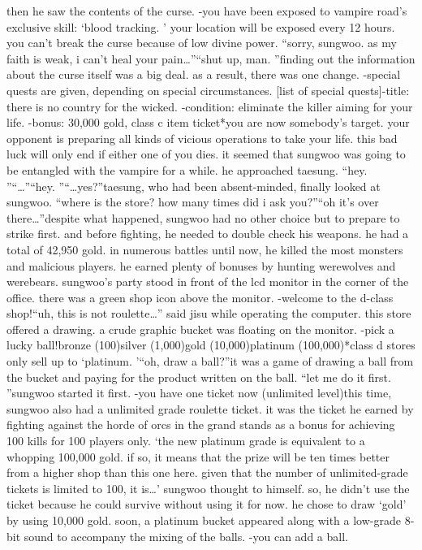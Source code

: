 then he saw the contents of the curse.
-you have been exposed to vampire road’s exclusive skill: ‘blood tracking.
’ your location will be exposed every 12 hours.
you can’t break the curse because of low divine power.
“sorry, sungwoo.
 as my faith is weak, i can’t heal your pain…”“shut up, man.
”finding out the information about the curse itself was a big deal.
as a result, there was one change.
-special quests are given, depending on special circumstances.
[list of special quests]-title: there is no country for the wicked.
-condition: eliminate the killer aiming for your life.
-bonus: 30,000 gold, class c item ticket*you are now somebody’s target.
 your opponent is preparing all kinds of vicious operations to take your life.
 this bad luck will only end if either one of you dies.
it seemed that sungwoo was going to be entangled with the vampire for a while.
he approached taesung.
“hey.
”“…”“hey.
”“…yes?”taesung, who had been absent-minded, finally looked at sungwoo.
“where is the store? how many times did i ask you?”“oh it’s over there…”despite what happened, sungwoo had no other choice but to prepare to strike first.
and before fighting, he needed to double check his weapons.
he had a total of 42,950 gold.
 in numerous battles until now, he killed the most monsters and malicious players.
 he earned plenty of bonuses by hunting werewolves and werebears.
sungwoo’s party stood in front of the lcd monitor in the corner of the office.
 there was a green shop icon above the monitor.
-welcome to the d-class shop!“uh, this is not roulette…” said jisu while operating the computer.
 this store offered a drawing.
 a crude graphic bucket was floating on the monitor.
-pick a lucky ball!bronze (100)silver (1,000)gold (10,000)platinum (100,000)*class d stores only sell up to ‘platinum.
’“oh, draw a ball?”it was a game of drawing a ball from the bucket and paying for the product written on the ball.
“let me do it first.
”sungwoo started it first.
-you have one ticket now (unlimited level)this time, sungwoo also had a unlimited grade roulette ticket.
 it was the ticket he earned by fighting against the horde of orcs in the grand stands as a bonus for achieving 100 kills for 100 players only.
‘the new platinum grade is equivalent to a whopping 100,000 gold.
 if so, it means that the prize will be ten times better from a higher shop than this one here.
 given that the number of unlimited-grade tickets is limited to 100, it is…’ sungwoo thought to himself.
so, he didn’t use the ticket because he could survive without using it for now.
 he chose to draw ‘gold’ by using 10,000 gold.
 soon, a platinum bucket appeared along with a low-grade 8-bit sound to accompany the mixing of the balls.
-you can add a ball.


